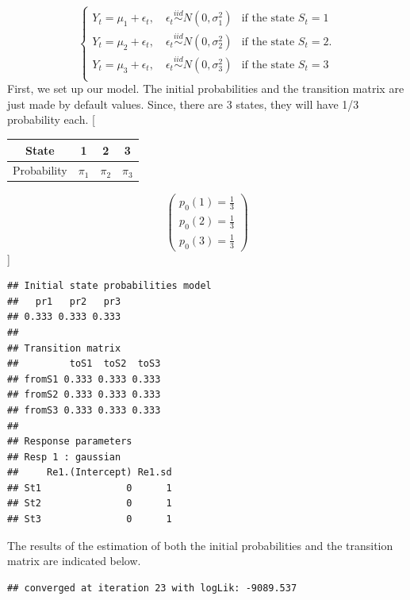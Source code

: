 \documentclass[
]{article}
\begin{document}
\begin{equation*}
\begin{cases}
Y_t = \mu_1 + \epsilon_t, \quad \epsilon_t \overset{iid}{\sim} N(0, \sigma_1^2)  
& \text{if the state $S_t=1$} \\
Y_t = \mu_2 + \epsilon_t, \quad \epsilon_t \overset{iid}{\sim} N(0, \sigma_2^2) 
&\text{if the state $S_t=2$}. \\

Y_t = \mu_3 + \epsilon_t, \quad \epsilon_t \overset{iid}{\sim} N(0, \sigma_3^2) 
& \text{if the state $S_t=3$} \\

\end{cases}
\end{equation*} First, we set up our model. The initial probabilities
and the transition matrix are just made by default values. Since, there
are 3 states, they will have 1/3 probability each. {[}

\begin{tabular}{c|ccc}
State & 1 & 2 & 3 \\
\hline
Probability & $\pi_1$ & $\pi_2$ & $\pi_3$
\end{tabular}

\begin{equation*}
\begin{pmatrix}
p_0(1) = \frac{1}{3}\\

p_0(2) = \frac{1}{3} \\

p_0(3) = \frac{1}{3}
\end{pmatrix}
\end{equation*} {]}

\begin{verbatim}
## Initial state probabilities model 
##   pr1   pr2   pr3 
## 0.333 0.333 0.333 
## 
## Transition matrix 
##         toS1  toS2  toS3
## fromS1 0.333 0.333 0.333
## fromS2 0.333 0.333 0.333
## fromS3 0.333 0.333 0.333
## 
## Response parameters 
## Resp 1 : gaussian 
##     Re1.(Intercept) Re1.sd
## St1               0      1
## St2               0      1
## St3               0      1
\end{verbatim}

The results of the estimation of both the initial probabilities and the
transition matrix are indicated below.

\begin{verbatim}
## converged at iteration 23 with logLik: -9089.537
\end{verbatim}
\end{document}
